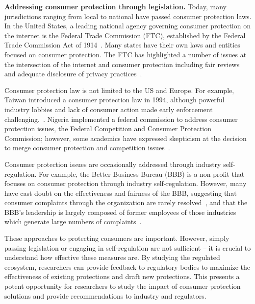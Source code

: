 \textbf{Addressing consumer protection through legislation.}
Today, many jurisdictions ranging from local to national have passed consumer protection laws. In the United States, a leading national agency governing consumer protection on the internet is the Federal Trade Commission (FTC), established by the Federal Trade Commission Act of 1914~\cite{ftcact}. Many states have their own laws and entities focused on consumer protection. The FTC has highlighted a number of issues at the intersection of the internet and consumer protection including fair reviews and adequate disclosure of privacy practices~\cite{ftc20approves,ftc21notice,ftc2021disclosures,ftc-privacy-survey1998,ftc-privacy-survey2000,ftc2021canspam,ftc1997principles}.

Consumer protection law is not limited to the US and Europe. For example, Taiwan introduced a consumer protection law in 1994, although powerful industry lobbies and lack of consumer action made early enforcement challenging.~\cite{juang1997taiwan}. Nigeria implemented a federal commission to address consumer protection issues, the Federal Competition and Consumer Protection Commission; however, some academics have expressed skepticism at the decision to merge consumer protection and competition issues~\cite{tavuyanago2020interface}.

Consumer protection issues are occasionally addressed through industry self-regulation. For example, the Better Business Bureau (BBB) is a non-profit that focuses on consumer protection through industry self-regulation. However, many have cast doubt on the effectiveness and fairness of the BBB, suggesting that consumer complaints through the organization are rarely resolved~\cite{fisher1999dissatisfied}, and that the BBB's leadership is largely composed of former employees of those industries which generate large numbers of complaints~\cite{garrett2007debate}.

These approaches to protecting consumers are important. However, simply passing legislation or engaging in self-regulation are not sufficient -- it is crucial to understand how effective these measures are. By studying the regulated ecosystem, researchers can provide feedback to regulatory bodies to maximize the effectiveness of existing protections and draft new protections. This presents a potent opportunity for researchers to study the impact of consumer protection solutions and provide recommendations to industry and regulators.


